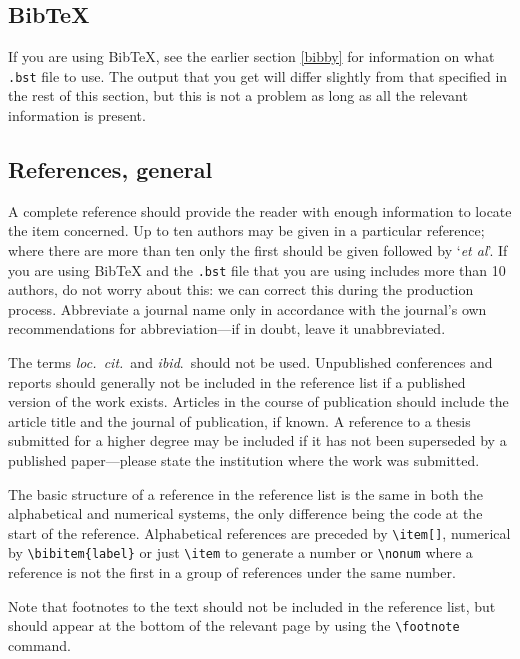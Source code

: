 \documentclass[12pt]{iopart}
\begin{document}
\subsection{BibTeX\label{bibtex}}
If you are using BibTeX, see the earlier section \ref{bibby} for information on what \verb".bst" file to use.
The output that you get will differ slightly from that specified in the rest of this section,
but this is not a problem as long as all the relevant information is present.

\subsection{References, general}
A complete reference should provide the reader with enough information to 
locate the item concerned. Up to ten authors may be given in a particular reference; where 
there are more than ten only the first should be given followed by 
`{\it et al}'.  If you are using BibTeX
and the \verb".bst" file that you are using includes more than 10 authors, do not worry about this:
we can correct this during the production process.  Abbreviate a journal name only in accordance with the journal's
own recommendations for abbreviation---if in doubt, leave it unabbreviated.

The terms {\it loc.\ cit.}\ and {\it ibid}.\ should not be used. 
Unpublished conferences and reports should generally not be included 
in the reference list if a published version of the work exists. Articles in the course of publication should 
include the article title and the journal of publication, if known. 
A reference to a thesis submitted for a higher degree may be included 
if it has not been superseded by a published 
paper---please state the institution where the work was submitted.

The basic structure of a reference in the reference list is the same in both the alphabetical and numerical systems, the only difference being the code at the start of the reference. Alphabetical references are preceded by \verb"\item[]", numerical by \verb"\bibitem{label}" or just \verb"\item" to generate a number or \verb"\nonum" where a reference is not the first in a group of references under the same number.

Note that footnotes to the text should not be 
included in the reference list, but should appear at the bottom of the relevant page by using the \verb"\footnote" command.
   
\end{document}
